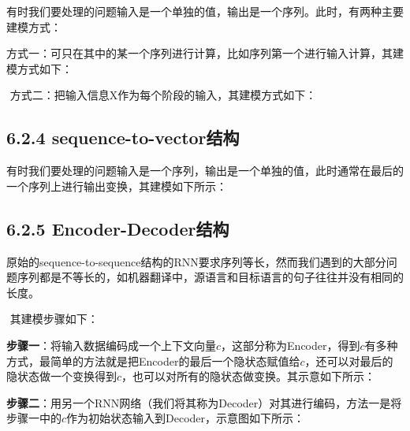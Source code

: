 ​
有时我们要处理的问题输入是一个单独的值，输出是一个序列。此时，有两种主要建模方式：

​
方式一：可只在其中的某一个序列进行计算，比如序列第一个进行输入计算，其建模方式如下：


​ 方式二：把输入信息X作为每个阶段的输入，其建模方式如下：


\subsection{6.2.4
sequence-to-vector结构}\label{sequence-to-vectorux7ed3ux6784}

​
有时我们要处理的问题输入是一个序列，输出是一个单独的值，此时通常在最后的一个序列上进行输出变换，其建模如下所示：


\subsection{6.2.5
Encoder-Decoder结构}\label{encoder-decoderux7ed3ux6784}

​
原始的sequence-to-sequence结构的RNN要求序列等长，然而我们遇到的大部分问题序列都是不等长的，如机器翻译中，源语言和目标语言的句子往往并没有相同的长度。

​ 其建模步骤如下：

​
\textbf{步骤一}：将输入数据编码成一个上下文向量\(c\)，这部分称为Encoder，得到\(c\)有多种方式，最简单的方法就是把Encoder的最后一个隐状态赋值给\(c\)，还可以对最后的隐状态做一个变换得到\(c\)，也可以对所有的隐状态做变换。其示意如下所示：


​
\textbf{步骤二}：用另一个RNN网络（我们将其称为Decoder）对其进行编码，方法一是将步骤一中的\(c​\)作为初始状态输入到Decoder，示意图如下所示：

